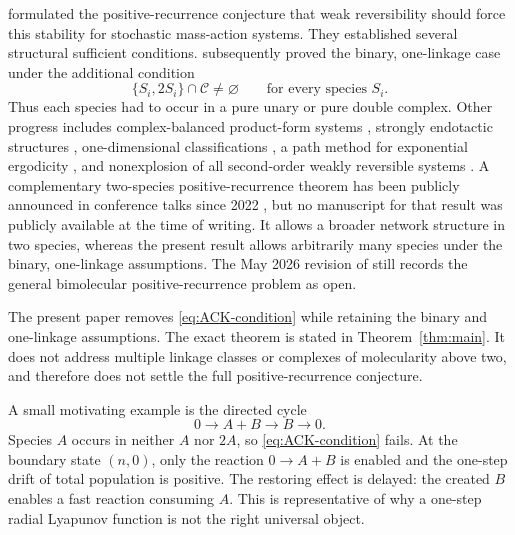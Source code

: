 \citet{AndersonKim2018} formulated the positive-recurrence conjecture that
weak reversibility should force this stability for stochastic mass-action
systems.  They established several structural sufficient conditions.
\citet{AndersonCappellettiKim2020} subsequently proved the binary,
one-linkage case under the additional condition
\begin{equation}\label{eq:ACK-condition}
  \{S_i,2S_i\}\cap\mathcal C\ne\varnothing
  \qquad\text{for every species }S_i.
\end{equation}
Thus each species had to occur in a pure unary or pure double complex.  Other
progress includes complex-balanced product-form systems
\citep{AndersonCraciunKurtz2010}, strongly endotactic structures
\citep{AndersonCappellettiKimNguyen2020}, one-dimensional classifications
\citep{WiufXu2023}, a path method for exponential ergodicity
\citep{AndersonCappellettiFanKim2025}, and nonexplosion of all second-order
weakly reversible systems \citep{Xu2026}.  A complementary two-species
positive-recurrence theorem has been publicly announced in conference talks
since 2022 \citep{Agazzi2022Talk,Agazzi2025Talk}, but no manuscript for that result was publicly
available at the time of writing.  It allows a broader network structure in
two species, whereas the present result allows arbitrarily many species under
the binary, one-linkage assumptions.  The May 2026 revision of
\citet{Xu2026} still records the general bimolecular positive-recurrence
problem as open.

The present paper removes \eqref{eq:ACK-condition} while retaining the binary
and one-linkage assumptions.  The exact theorem is stated in
Theorem~\ref{thm:main}.  It does not address multiple linkage classes or
complexes of molecularity above two, and therefore does not settle the full
positive-recurrence conjecture.

A small motivating example is the directed cycle
\begin{equation}\label{eq:stress}
  0\longrightarrow A+B\longrightarrow B\longrightarrow0.
\end{equation}
Species \(A\) occurs in neither \(A\) nor \(2A\), so
\eqref{eq:ACK-condition} fails.  At the boundary state \((n,0)\), only the
reaction \(0\to A+B\) is enabled and the one-step drift of total population
is positive.  The restoring effect is delayed: the created \(B\) enables a
fast reaction consuming \(A\).  This is representative of why a one-step
radial Lyapunov function is not the right universal object.

